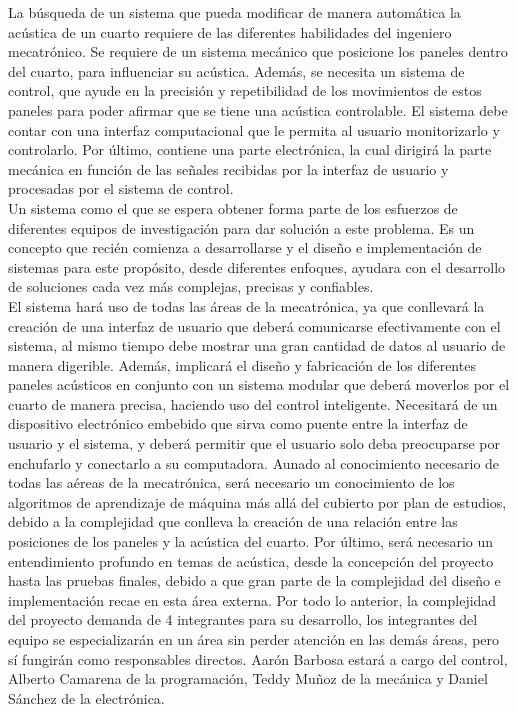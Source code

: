 La búsqueda de un sistema que pueda modificar de manera automática la acústica de un cuarto requiere de las diferentes habilidades del ingeniero mecatrónico. Se requiere de un sistema mecánico que posicione los paneles dentro del cuarto, para influenciar su acústica. Además, se necesita un sistema de control, que ayude en la precisión y repetibilidad de los movimientos de estos paneles para poder afirmar que se tiene una acústica controlable. El sistema debe contar con una interfaz computacional que le permita al usuario monitorizarlo y controlarlo. Por último, contiene una parte electrónica, la cual dirigirá la parte mecánica en función de las señales recibidas por la interfaz de usuario y procesadas por el sistema de control.
\\
Un sistema como el que se espera obtener forma parte de los esfuerzos de diferentes equipos de investigación para dar solución a este problema. Es un concepto que recién comienza a desarrollarse y el diseño e implementación de sistemas para este propósito, desde diferentes enfoques, ayudara con el desarrollo de soluciones cada vez más complejas, precisas y confiables.
\\
El sistema hará uso de todas las áreas de la mecatrónica, ya que conllevará la creación de una interfaz de usuario que deberá comunicarse efectivamente con el sistema, al mismo tiempo debe mostrar una gran cantidad de datos al usuario de manera digerible. Además, implicará el diseño y fabricación de los diferentes paneles acústicos en conjunto con un sistema modular que deberá moverlos por el cuarto de manera precisa, haciendo uso del control inteligente. Necesitará de un dispositivo electrónico embebido que sirva como puente entre la interfaz de usuario y el sistema, y deberá permitir que el usuario solo deba preocuparse por enchufarlo y conectarlo a su computadora. Aunado al conocimiento necesario de todas las aéreas de la mecatrónica, será necesario un conocimiento de los algoritmos de aprendizaje de máquina más allá del cubierto por plan de estudios, debido a la complejidad que conlleva la creación de una relación entre las posiciones de los paneles y la acústica del cuarto. Por último, será necesario un entendimiento profundo en temas de acústica, desde la concepción del proyecto hasta las pruebas finales, debido a que gran parte de la complejidad del diseño e implementación recae en esta área externa. Por todo lo anterior, la complejidad del proyecto demanda de 4 integrantes para su desarrollo, los integrantes del equipo se especializarán en un área sin perder atención en las demás áreas, pero sí fungirán como responsables directos. Aarón Barbosa estará a cargo del control, Alberto Camarena de la programación, Teddy Muñoz de la mecánica y Daniel Sánchez de la electrónica.